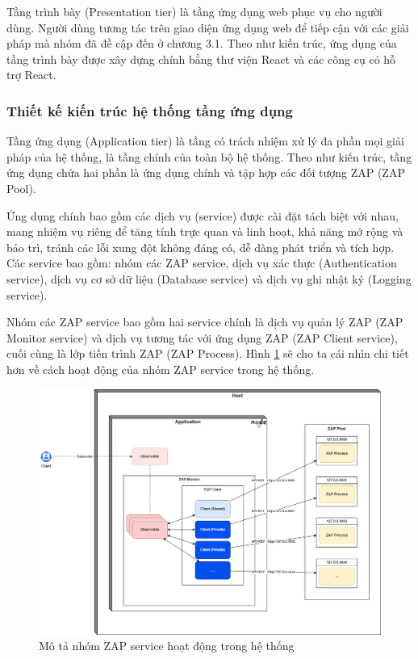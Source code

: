 \tab Tầng trình bày (Presentation tier) là tầng ứng dụng web phục vụ cho người dùng.
Người dùng tương tác trên giao diện ứng dụng web để tiếp cận với các giải pháp mà nhóm đã đề cập đến ở chương 3.1.
Theo như kiến trúc, ứng dụng của tầng trình bày được xây dựng chính bằng thư viện React và các công cụ có hỗ trợ React.

\subsubsection{Thiết kế kiến trúc hệ thống tầng ứng dụng}

\tab Tầng ứng dụng (Application tier) là tầng có trách nhiệm xử lý đa phần mọi giải pháp của hệ thống, là tầng chính của toàn bộ hệ thống.
Theo như kiến trúc, tầng ứng dụng chứa hai phần là ứng dụng chính và tập hợp các đối tượng ZAP (ZAP Pool).
\par

Ứng dụng chính bao gồm các dịch vụ (service) được cài đặt tách biệt với nhau, mang nhiệm vụ riêng để tăng tính trực quan và linh hoạt, khả năng mở rộng và bảo trì, tránh các lỗi xung đột không đáng có, dễ dàng phát triển và tích hợp.
Các service bao gồm: nhóm các ZAP service, dịch vụ xác thực (Authentication service), dịch vụ cơ sở dữ liệu (Database service) và dịch vụ ghi nhật ký (Logging service).
\par

\tab \tab Nhóm các ZAP service bao gồm hai service chính là dịch vụ quản lý ZAP (ZAP Monitor service) và dịch vụ tương tác với ứng dụng ZAP (ZAP Client service), cuối cùng là lớp tiến trình ZAP (ZAP Process).
Hình \ref{fig:NhomZapServiceHoatDong} sẽ cho ta cái nhìn chi tiết hơn về cách hoạt động của nhóm ZAP service trong hệ thống.

\begin{figure}[H]
      \centering
      \includegraphics[width=\textwidth]{applied-thesis-chapters/chapter-3/Mô tả nhóm ZAP service hoạt động trong hệ thống.png}
      \caption{Mô tả nhóm ZAP service hoạt động trong hệ thống}
      \label{fig:NhomZapServiceHoatDong}
\end{figure}


